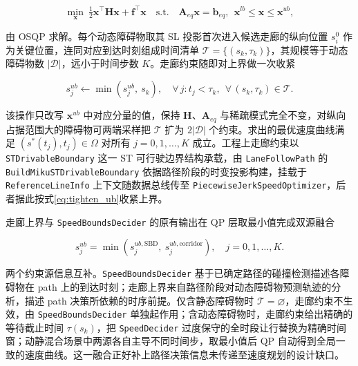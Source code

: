 \documentclass[a4paper,11pt]{ctexart}
\theoremstyle{definition}
\begin{document}
\begin{equation}
    \min_{\mathbf{x}}\ \tfrac{1}{2}\mathbf{x}^{\top}\mathbf{H}\mathbf{x} + \mathbf{f}^{\top}\mathbf{x}
    \quad \text{s.t.}\quad \mathbf{A}_{eq}\mathbf{x} = \mathbf{b}_{eq},\ \ \mathbf{x}^{lb} \leq \mathbf{x} \leq \mathbf{x}^{ub},
    \label{eq:qp_compact}
\end{equation}

由 OSQP 求解。每个动态障碍物取其 SL 投影首次进入候选走廊的纵向位置 $s_i^{0}$ 作为关键位置，连同对应到达时刻组成时间清单 $\mathcal{T} = \{(s_k, \tau_k)\}$，其规模等于动态障碍物数 $|\mathcal{D}|$，远小于时间步数 $K$。走廊约束随即对上界做一次收紧

\begin{equation}
    s_j^{ub} \leftarrow \min\!\left(s_j^{ub},\ s_k\right), \quad \forall\, j: t_j < \tau_k,\ \ \forall\, (s_k, \tau_k) \in \mathcal{T}.
    \label{eq:tighten_ub}
\end{equation}

该操作只改写 $\mathbf{x}^{ub}$ 中对应分量的值，保持 $\mathbf{H}$、$\mathbf{A}_{eq}$ 与稀疏模式完全不变，对纵向占据范围大的障碍物可两端采样把 $\mathcal{T}$ 扩为 $2|\mathcal{D}|$ 个约束。求出的最优速度曲线满足 $(s^{*}(t_j), t_j) \in \Omega$ 对所有 $j=0,1,\ldots,K$ 成立。工程上走廊约束以 \texttt{STDrivableBoundary} 这一 ST 可行驶边界结构承载，由 \texttt{LaneFollowPath} 的 \texttt{BuildMikuSTDrivableBoundary} 依据路径阶段的时变投影构建，挂载于 \texttt{ReferenceLineInfo} 上下文随数据总线传至 \texttt{PiecewiseJerkSpeedOptimizer}，后者据此按式\eqref{eq:tighten_ub}收紧上界。

走廊上界与 \texttt{SpeedBoundsDecider} 的原有输出在 QP 层取最小值完成双源融合

\begin{equation}
    s_j^{ub} = \min\!\left(s_j^{ub,\mathrm{SBD}},\ s_j^{ub,\mathrm{corridor}}\right), \quad j = 0,1,\ldots,K.
    \label{eq:dual_source}
\end{equation}

两个约束源信息互补。\texttt{SpeedBoundsDecider} 基于已确定路径的碰撞检测描述各障碍物在 path 上的到达时刻；走廊上界来自路径阶段对动态障碍物预测轨迹的分析，描述 path 决策所依赖的时序前提。仅含静态障碍物时 $\mathcal{T}=\varnothing$，走廊约束不生效，由 \texttt{SpeedBoundsDecider} 单独起作用；含动态障碍物时，走廊约束给出精确的等待截止时间 $\tau(s_k)$，把 \texttt{SpeedDecider} 过度保守的全时段让行替换为精确时间窗；动静混合场景中两源各自主导不同时间步，取最小值后 QP 自动得到全局一致的速度曲线。这一融合正好补上路径决策信息未传递至速度规划的设计缺口。
\end{document}
